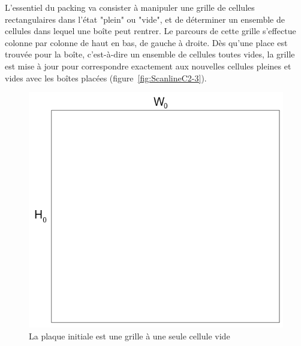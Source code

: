 \newpage
\indent L'essentiel du packing va consister à manipuler une grille de cellules rectangulaires dans l'état "plein" ou "vide", et de déterminer un ensemble de cellules dans lequel une boîte peut rentrer. Le parcours de cette grille s'effectue colonne par colonne de haut en bas, de gauche à droite. Dès qu'une place est trouvée pour la boîte, c'est-à-dire un ensemble de cellules toutes vides, la grille est mise à jour pour correspondre exactement aux nouvelles cellules pleines et vides avec les boîtes placées (figure~\ref{fig:ScanlineC2-3}).

\begin{figure}[!htb]
\centering
\includegraphics[scale=0.4]{img/ScanlineC1.png}
\caption{La plaque initiale est une grille à une seule cellule vide}
\label{fig:ScanlineC1}
\end{figure}

